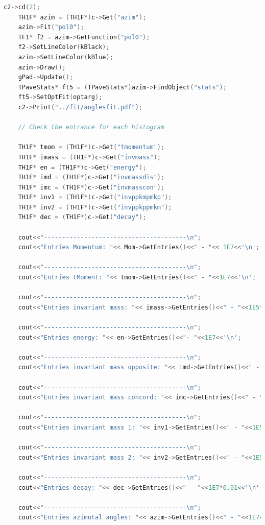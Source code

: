 \documentclass[a4paper, 11pt]{article}
\begin{document}
\begin{lstlisting}[language=c++, style=code]
    c2->cd(2);
    TH1F* azim = (TH1F*)c->Get("azim");
    azim->Fit("pol0");
    TF1* f2 = azim->GetFunction("pol0");
    f2->SetLineColor(kBlack);
    azim->SetLineColor(kBlue);
    azim->Draw();
    gPad->Update();
    TPaveStats* ft5 = (TPaveStats*)azim->FindObject("stats");
    ft5->SetOptFit(optarg);
    c2->Print("../fit/anglesfit.pdf");

    // Check the entrance for each histogram

    TH1F* tmom = (TH1F*)c->Get("tmomentum");
    TH1F* imass = (TH1F*)c->Get("invmass");
    TH1F* en = (TH1F*)c->Get("energy");
    TH1F* imd = (TH1F*)c->Get("invmassdis");
    TH1F* imc = (TH1F*)c->Get("invmasscon");
    TH1F* inv1 = (TH1F*)c->Get("invppkmpmkp");
    TH1F* inv2 = (TH1F*)c->Get("invppkppmkm");
    TH1F* dec = (TH1F*)c->Get("decay");

    cout<<"---------------------------------------\n";
    cout<<"Entries Momentum: "<< Mom->GetEntries()<<" - "<< 1E7<<'\n';

    cout<<"---------------------------------------\n";
    cout<<"Entries tMoment: "<< tmom->GetEntries()<<" - "<<1E7<<'\n';

    cout<<"---------------------------------------\n";
    cout<<"Entries invariant mass: "<< imass->GetEntries()<<" - "<<1E5*101*100/2<<'\n';

    cout<<"---------------------------------------\n";
    cout<<"Entries energy: "<< en->GetEntries()<<"- "<<1E7<<'\n';

    cout<<"---------------------------------------\n";
    cout<<"Entries invariant mass opposite: "<< imd->GetEntries()<<" - "<<1E5*101*100*0.495/2<<'\n';

    cout<<"---------------------------------------\n";
    cout<<"Entries invariant mass concord: "<< imc->GetEntries()<<" - "<<1E5*101*100*0.495/2<<'\n';

    cout<<"---------------------------------------\n";
    cout<<"Entries invariant mass 1: "<< inv1->GetEntries()<<" - "<<1E5*101*100<<'\n';

    cout<<"---------------------------------------\n";
    cout<<"Entries invariant mass 2: "<< inv2->GetEntries()<<" - "<<1E5*101*100<<'\n';

    cout<<"---------------------------------------\n";
    cout<<"Entries decay: "<< dec->GetEntries()<<" - "<<1E7*0.01<<'\n';

    cout<<"---------------------------------------\n";
    cout<<"Entries azimutal angles: "<< azim->GetEntries()<<" - "<<1E7<<'\n';


\end{lstlisting}
\end{document}
